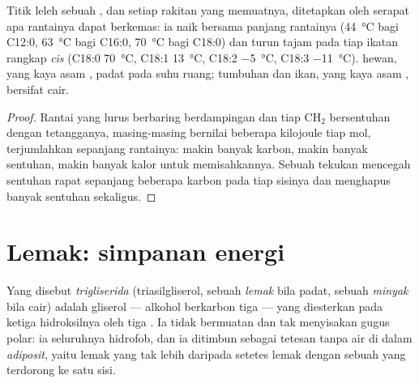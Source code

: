 \begin{proposition}\label{prop:b1:lipids:melting}
Titik leleh sebuah , dan  setiap rakitan  yang
memuatnya, ditetapkan oleh serapat apa rantainya dapat berkemas: ia
naik bersama panjang rantainya (\qty{44}{\celsius} bagi C12:0,
\qty{63}{\celsius} bagi C16:0, \qty{70}{\celsius} bagi C18:0) dan turun
tajam pada tiap ikatan rangkap \emph{cis} (C18:0 \qty{70}{\celsius},
C18:1 \qty{13}{\celsius}, C18:2 \qty{-5}{\celsius}, C18:3
\qty{-11}{\celsius}).  hewan, yang kaya asam , padat pada
suhu ruang;  tumbuhan dan  ikan, yang kaya asam ,
bersifat cair.
\end{proposition}
\begin{proof}
Rantai yang lurus berbaring berdampingan dan tiap $\mathrm{CH_2}$
bersentuhan  dengan tetangganya, masing-masing bernilai
beberapa kilojoule tiap mol, terjumlahkan sepanjang rantainya: makin
banyak karbon, makin banyak sentuhan, makin banyak kalor untuk
memisahkannya. Sebuah tekukan mencegah sentuhan rapat sepanjang
beberapa karbon pada tiap sisinya dan menghapus banyak sentuhan
sekaligus.
\end{proof}

\section{Lemak: simpanan energi}

\begin{definition}[Trigliserida]\label{def:b1:lipids:triglyceride}
Yang disebut \emph{trigliserida} (triasilgliserol,
sebuah \emph{lemak} bila padat, sebuah
\emph{minyak} bila cair) adalah gliserol --- alkohol
berkarbon tiga --- yang diesterkan pada ketiga hidroksilnya oleh tiga
. Ia tidak bermuatan dan tak menyisakan gugus polar: ia
seluruhnya hidrofob, dan ia ditimbun sebagai tetesan tanpa air di dalam
\emph{adiposit}, yaitu   lemak yang tak lebih
daripada setetes lemak dengan sebuah  yang terdorong ke satu sisi.
\end{definition}

